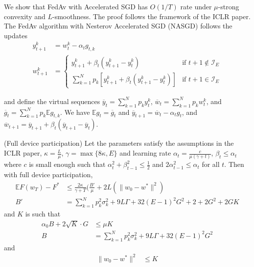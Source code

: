 We show that FedAv with Accelerated SGD has $O(1/T)$ rate under $\mu$-strong
convexity and $L$-smoothness. The proof follows the framework of
the ICLR paper. The FedAv algorithm with Nesterov Accelerated SGD
(NASGD) follows the updates
\begin{align*}
y_{t+1}^{k} & =w_{t}^{k}-\alpha_{t}g_{t,k}\\
w_{t+1}^{k} & =\begin{cases}
y_{t+1}^{k}+\beta_{t}(y_{t+1}^{k}-y_{t}^{k}) & \text{if }t+1\notin\mathcal{I}_{E}\\
\sum_{k=1}^{N}p_{k}\left[y_{t+1}^{k}+\beta_{t}(y_{t+1}^{k}-y_{t}^{k})\right] & \text{if }t+1\in\mathcal{I}_{E}
\end{cases}
\end{align*}

and define the virtual sequences $\overline{y}_{t}=\sum_{k=1}^{N}p_{k}y_{t}^{k}$,
$\overline{w}_{t}=\sum_{k=1}^{N}p_{k}w_{t}^{k}$, and $\overline{g}_{t}=\sum_{k=1}^{N}p_{k}\mathbb{E}g_{t,k}$.
We have $\mathbb{E}g_{t}=\overline{g}_{t}$ and $\overline{y}_{t+1}=\overline{w}_{t}-\alpha_{t}g_{t}$,
and $\overline{w}_{t+1}=\overline{y}_{t+1}+\beta_{t}(\overline{y}_{t+1}-\overline{y}_{t})$. 
\begin{theorem}
	(Full device participation) Let the parameters satisfy the assumptions
	in the ICLR paper, $\kappa=\frac{L}{\mu}$, $\gamma=\max\{8\kappa,E\}$
	and learning rate $\alpha_{t}=\frac{c}{\mu(\gamma+t)}$, $\beta_{t}\leq\alpha_{t}$
	where $c$ is small enough such that $\alpha_{t}^{2}+\beta_{t-1}^{2}\leq\frac{1}{2}$
	and $2\alpha_{t-1}^{2}\leq\alpha_{t}$ for all $t$. Then with full
	device participation, 
	\begin{align*}
	\mathbb{E}F(w_{T})-F^{\ast} & \leq\frac{2\kappa}{\gamma+T}(\frac{B'}{\mu}+2L(\|w_{0}-w^{\ast}\|^{2})\\
	B' & =\sum_{k=1}^{N}p_{k}^{2}\sigma_{k}^{2}+9L\Gamma+32(E-1)^{2}G^{2}+2+2G^{2}+2GK
	\end{align*}
	and $K$ is such that 
	\begin{align*}
	\alpha_{0}B+2\sqrt{K}\cdot G & \leq\mu K\\
	B & =\sum_{k=1}^{N}p_{k}^{2}\sigma_{k}^{2}+9L\Gamma+32(E-1)^{2}G^{2}
	\end{align*}
	and
	\begin{align*}
	\|w_{0}-w^{\ast}\|^{2} & \leq K
	\end{align*}
\end{theorem}
